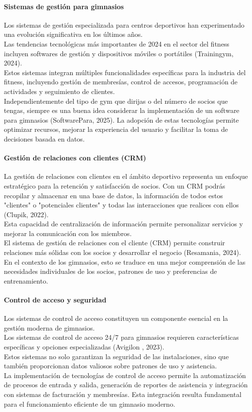 \documentclass[12pt, letterpaper]{article}
\begin{document}
\paragraph{\textbf{Sistemas de gestión para gimnasios}}
Los sistemas de gestión especializada para centros deportivos han experimentado una evolución significativa en los últimos años.\\ Las tendencias tecnológicas más importantes de 2024 en el sector del fitness incluyen softwares de gestión y dispositivos móviles o portátiles (Trainingym, 2024).\\ Estos sistemas integran múltiples funcionalidades específicas para la industria del fitness, incluyendo gestión de membresías, control de accesos, programación de actividades y seguimiento de clientes.\\
Independientemente del tipo de gym que dirijas o del número de socios que tengas, siempre es una buena idea considerar la implementación de un software para gimnasios (SoftwarePara, 2025). La adopción de estas tecnologías permite optimizar recursos, mejorar la experiencia del usuario y facilitar la toma de decisiones basada en datos.
\paragraph{\textbf{Gestión de relaciones con clientes (CRM)}}
La gestión de relaciones con clientes en el ámbito deportivo representa un enfoque estratégico para la retención y satisfacción de socios. Con un CRM podrás recopilar y almacenar en una base de datos, la información de todos estos "clientes" o "potenciales clientes" y todas las interacciones que realices con ellos (Clupik, 2022).\\ Esta capacidad de centralización de información permite personalizar servicios y mejorar la comunicación con los miembros.\\
El sistema de gestión de relaciones con el cliente (CRM) permite construir relaciones más sólidas con los socios y desarrollar el negocio (Resamania, 2024). En el contexto de los gimnasios, esto se traduce en una mejor comprensión de las necesidades individuales de los socios, patrones de uso y preferencias de entrenamiento.\\
\paragraph{\textbf{Control de acceso y seguridad}}
Los sistemas de control de acceso constituyen un componente esencial en la gestión moderna de gimnasios.\\ Los sistemas de control de acceso 24/7 para gimnasios requieren características específicas y opciones especializadas (Avigilon , 2023).\\ Estos sistemas no solo garantizan la seguridad de las instalaciones, sino que también proporcionan datos valiosos sobre patrones de uso y asistencia.\\
La implementación de tecnologías de control de acceso permite la automatización de procesos de entrada y salida, generación de reportes de asistencia y integración con sistemas de facturación y membresías. Esta integración resulta fundamental para el funcionamiento eficiente de un gimnasio moderno.\\
\end{document}
